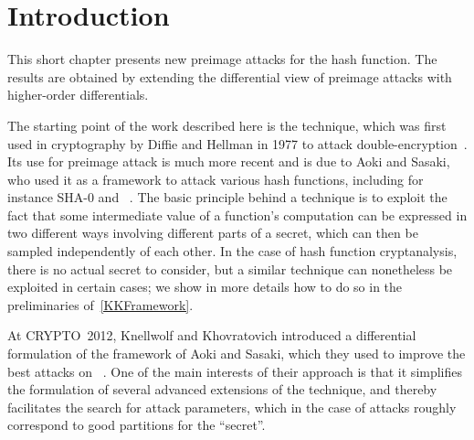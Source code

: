 \section{Introduction}

This short chapter presents new preimage attacks for the \shaone hash function.
The results are obtained by extending the differential view of \mitm preimage attacks with higher-order differentials.

\medskip

The starting point of the work described here is the \mitm technique, which
was first used in cryptography by Diffie and Hellman in 1977 to attack double-encryption~\cite{DH77}.
Its use for preimage attack is much more recent and is due to Aoki and Sasaki, who used it as a framework to
attack various hash functions, including for instance SHA-0 and \shaone~\cite{AS09}.
The basic principle behind a \mitm technique is to exploit the fact that some intermediate value of
a function's computation can be expressed
in two different ways involving different parts of a secret, which can then be sampled independently of
each other. In the case of hash function cryptanalysis, there is no actual secret to consider, but a
similar technique can nonetheless be exploited in certain cases; we show in more details how to do
so in the preliminaries of~\autoref{KKFramework}.

At CRYPTO~2012, Knellwolf and Khovratovich introduced a differential formulation of the \mitm framework
of Aoki and Sasaki, which they used to improve the best attacks on \shaone~\cite{DBLP:conf/crypto/KnellwolfK12}. One of the main interests
of their approach is that it simplifies the formulation of several advanced extensions of
the \mitm technique, and thereby facilitates the search for attack parameters, which in the case
of \mitm attacks roughly correspond to good partitions for the ``secret''.

